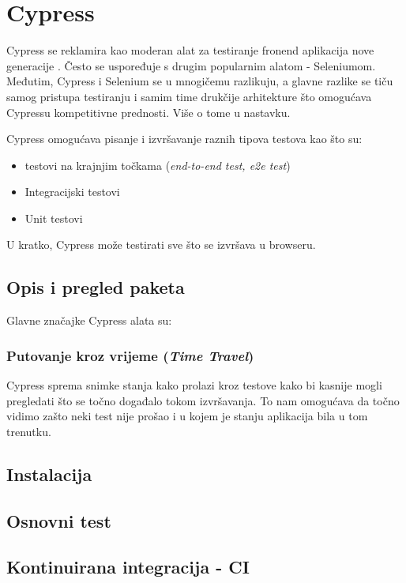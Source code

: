 \chapter{Cypress}\label{ch_cypress}
Cypress se reklamira kao moderan alat za testiranje fronend aplikacija nove generacije \cite{cypressDocsPage}.
Često se uspoređuje s drugim popularnim alatom - Seleniumom.
Međutim, Cypress i Selenium se u mnogičemu razlikuju, a glavne razlike se tiču samog pristupa testiranju i samim time drukčije arhitekture što omogućava Cypressu kompetitivne prednosti.
Više o tome u nastavku.

Cypress omogućava pisanje i izvršavanje raznih tipova testova kao što su:
\begin{itemize}
    \item testovi na krajnjim točkama (\textit{end-to-end test, e2e test})
    \item Integracijski testovi
    \item Unit testovi
\end{itemize}
U kratko, Cypress može testirati sve što se izvršava u browseru.

\section{Opis i pregled paketa}
Glavne značajke Cypress alata su:
\subsection*{Putovanje kroz vrijeme (\textit{Time Travel})}
Cypress sprema snimke stanja kako prolazi kroz testove kako bi kasnije mogli pregledati što se točno događalo tokom izvršavanja. 
To nam omogućava da točno vidimo zašto neki test nije prošao i u kojem je stanju aplikacija bila u tom trenutku.


\section{Instalacija}

\section{Osnovni test}

\section{Kontinuirana integracija - CI}
